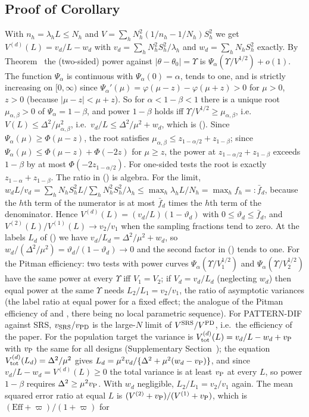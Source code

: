 \subsection{Proof of Corollary~}\label{si:testing-are}

With $n_h=\lambda_hL\le N_h$ and $V=\sum_hN_h^2(1/n_h-1/N_h)S_h^2$ we get $V^{(d)}(L)=v_d/L-w_d$ with $v_d=\sum_hN_h^2S_h^2/\lambda_h$ and $w_d=\sum_hN_hS^2_h$ exactly. By Theorem~ the (two-sided) power against $|\theta-\theta_0|=\Upsilon$ is $\Psi_\alpha(\Upsilon/V^{1/2})+o(1)$. The function $\Psi_\alpha$ is continuous with $\Psi_\alpha(0)=\alpha$, tends to one, and is strictly increasing on $[0,\infty)$ since $\Psi_\alpha'(\mu)=\varphi(\mu-z)-\varphi(\mu+z)>0$ for $\mu>0$, $z>0$ (because $|\mu-z|<\mu+z$). So for $\alpha<1-\beta<1$ there is a unique root $\mu_{\alpha,\beta}>0$ of $\Psi_\alpha=1-\beta$, and power $1-\beta$ holds iff $\Upsilon/V^{1/2}\ge\mu_{\alpha,\beta}$, i.e.\ $V(L)\le\Delta^2/\mu^2_{\alpha,\beta}$, i.e.\ $v_d/L\le\Delta^2/\mu^2+w_d$, which is (). Since $\Psi_\alpha(\mu)\ge\Phi(\mu-z)$, the root satisfies $\mu_{\alpha,\beta}\le z_{1-\alpha/2}+z_{1-\beta}$; since $\Psi_\alpha(\mu)\le\Phi(\mu-z)+\Phi(-2z)$ for $\mu\ge z$, the power at $z_{1-\alpha/2}+z_{1-\beta}$ exceeds $1-\beta$ by at most $\Phi(-2z_{1-\alpha/2})$. For one-sided tests the root is exactly $z_{1-\alpha}+z_{1-\beta}$. The ratio in () is algebra. For the limit, $w_dL/v_d=\sum_hN_hS^2_hL\big/\sum_hN_h^2S^2_h/\lambda_h\le\max_h\lambda_hL/N_h=\max_hf_h=:\bar f_d$, because the $h$th term of the numerator is at most $\bar f_d$ times the $h$th term of the denominator. Hence $V^{(d)}(L)=(v_d/L)(1-\vartheta_d)$ with $0\le\vartheta_d\le\bar f_d$, and $V^{(2)}(L)/V^{(1)}(L)\to v_2/v_1$ when the sampling fractions tend to zero. At the labels $L_d$ of () we have $v_d/L_d=\Delta^2/\mu^2+w_d$, so $w_d/(\Delta^2/\mu^2)=\vartheta_d/(1-\vartheta_d)\to0$ and the second factor in () tends to one. For the Pitman efficiency: two tests with power curves $\Psi_\alpha(\Upsilon/V_1^{1/2})$ and $\Psi_\alpha(\Upsilon/V_2^{1/2})$ have the same power at every $\Upsilon$ iff $V_1=V_2$; if $V_d=v_d/L_d$ (neglecting $w_d$) then equal power at the same $\Upsilon$ needs $L_2/L_1=v_2/v_1$, the ratio of asymptotic variances (the label ratio at equal power for a fixed effect; the analogue of the Pitman efficiency of \citealt[Ch.~14]{vandervaart1998} and \citealt{noether1955}, there being no local parametric sequence). For PATTERN-DIF against SRS, $v_{\rm SRS}/v_{\rm PD}$ is the large-$N$ limit of $V^{\rm SRS}/V^{\rm PD}$, i.e.\ the efficiency of the paper. For the population target the variance is $V^{(d)}_{\rm tot}(L)=v_d/L-w_d+v_{\rm P}$ with $v_{\rm P}$ the same for all designs (Supplementary Section~); the equation $V_{\rm tot}^{(d)}(L_d)=\Delta^2/\mu^2$ gives $L_d=\mu^2v_d/\{\Delta^2+\mu^2(w_d-v_{\rm P})\}$, and since $v_d/L-w_d=V^{(d)}(L)\ge0$ the total variance is at least $v_{\rm P}$ at every $L$, so power $1-\beta$ requires $\Delta^2\ge\mu^2v_{\rm P}$. With $w_d$ negligible, $L_2/L_1=v_2/v_1$ again. The mean squared error ratio at equal $L$ is $(V^{(2)}+v_{\rm P})/(V^{(1)}+v_{\rm P})$, which is $(\mathrm{Eff}+\varpi)/(1+\varpi)$ for 